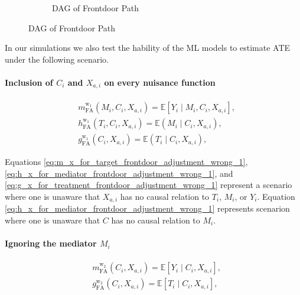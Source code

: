 \documentclass{article}
\numberwithin{equation}{section}
\newenvironment{colorparagraph}[1]{\par\color{#1}}{\par}
\begin{document}
{\begin{colorparagraph}{annotationcolor}
\begin{figure}[H]
{\begin{minipage}{0.99\textwidth}
\begin{figure}[H]
            \caption{DAG of Frontdoor Path}
            \label{fig:dag_frontdoor_path}
        \end{figure}
        \vspace{0.3cm}
    \end{minipage}
    }
\end{figure}

In our simulations we also test the hability of the ML models to estimate ATE under the following scenario.

\paragraph{Inclusion of $C_i$ and $X_{a, i}$ on every nuisance function}

\begin{align}
    & m_{\text{FA}}^{\text{w}_1}(M_i, C_i, X_{a, i}) = \mathbb{E}[Y_i \mid M_i, C_i, X_{a, i}],
    \label{eq:m_x_for_target_frontdoor_adjustment_wrong_1} \\
    & h_{\text{FA}}^{\text{w}_1}(T_i, C_i, X_{a, i}) = \mathbb{E}(M_i \mid C_i, X_{a, i}),
    \label{eq:h_x_for_mediator_frontdoor_adjustment_wrong_1} \\
    & g_{\text{FA}}^{\text{w}_1}(C_i, X_{a, i}) = \mathbb{E}(T_i \mid C_i, X_{a, i}),
    \label{eq:g_x_for_treatment_frontdoor_adjustment_wrong_1}
\end{align}

Equations \eqref{eq:m_x_for_target_frontdoor_adjustment_wrong_1}, \eqref{eq:h_x_for_mediator_frontdoor_adjustment_wrong_1}, and \eqref{eq:g_x_for_treatment_frontdoor_adjustment_wrong_1} represent a scenario where one is unaware that $X_{a, i}$ has no causal relation to $T_i$, $M_i$, or $Y_i$. Equation \eqref{eq:h_x_for_mediator_frontdoor_adjustment_wrong_1} represents scenarion where one is unaware that $C$ has no causal relation to $M_i$.

\paragraph{Ignoring the mediator $M_i$}

\begin{align}
    & m_{\text{FA}}^{\text{w}_2}(C_i, X_{a, i}) = \mathbb{E}[Y_i \mid C_i, X_{a, i}],
    \label{eq:m_x_for_target_frontdoor_adjustment_wrong_2} \\
    & g_{\text{FA}}^{\text{w}_2}(C_i, X_{a, i}) = \mathbb{E}[T_i \mid C_i, X_{a, i}],
    \label{eq:g_x_for_treatment_frontdoor_adjustment_wrong_2}
\end{align}


\end{colorparagraph}}
\end{document}
